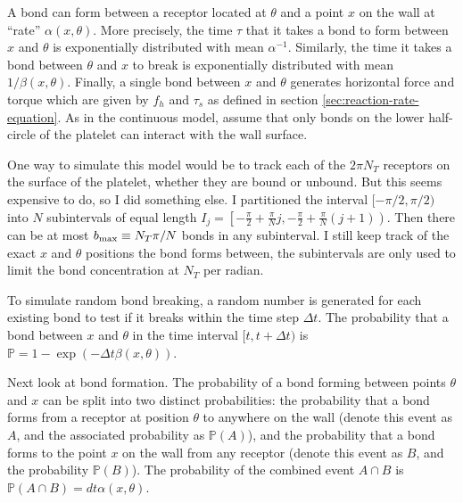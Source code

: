 \documentclass{article}
\newcommand{\tn}{\textnormal}
\begin{document}
A bond can form between a receptor located at $\theta$ and a point $x$
on the wall at ``rate'' $\alpha(x, \theta)$. More precisely, the time
$\tau$ that it takes a bond to form between $x$ and $\theta$ is
exponentially distributed with mean $\alpha^{-1}$. Similarly, the time
it takes a bond between $\theta$ and $x$ to break is exponentially
distributed with mean $1/\beta(x, \theta)$. Finally, a single bond
between $x$ and $\theta$ generates horizontal force and torque which
are given by $f_h$ and $\tau_s$ as defined in section
\ref{sec:reaction-rate-equation}. As in the continuous model, assume
that only bonds on the lower half-circle of the platelet can interact
with the wall surface.

One way to simulate this model would be to track each of the $2\pi
N_T$ receptors on the surface of the platelet, whether they are bound
or unbound. But this seems expensive to do, so I did something else. I
partitioned the interval $[-\pi/2, \pi/2)$ into $N$ subintervals of
equal length $I_j = \left[-\frac{\pi}{2} + \frac{\pi}{N}j,
  -\frac{\pi}{2} + \frac{\pi}{N} (j+1)\right)$. Then there can be at
most $b_\tn{max} \equiv N_T \pi/N$ bonds in any subinterval. I still
keep track of the exact $x$ and $\theta$ positions the bond forms
between, the subintervals are only used to limit the bond
concentration at $N_T$ per radian. 

To simulate random bond breaking, a random number is generated for
each existing bond to test if it breaks within the time step $\Delta
t$. The probability that a bond between $x$ and $\theta$ in the time
interval $[t, t + \Delta t)$ is $\mathbb{P} = 1 - \exp(-\Delta t
\beta(x, \theta))$.

Next look at bond formation. The probability of a bond forming between
points $\theta$ and $x$ can be split into two distinct probabilities:
the probability that a bond forms from a receptor at position $\theta$
to anywhere on the wall (denote this event as $A$, and the associated
probability as $\mathbb{P}(A)$), and the probability that a bond forms
to the point $x$ on the wall from any receptor (denote this event as
$B$, and the probability $\mathbb{P}(B)$). The probability of the
combined event $A \cap B$ is $\mathbb{P}(A \cap B) = dt
\alpha(x, \theta)$. 


\end{document}
